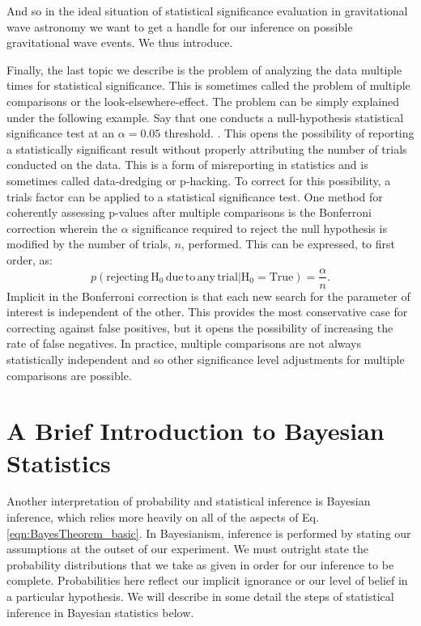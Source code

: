 And so in the ideal situation of statistical significance evaluation in gravitational wave astronomy we want to get a handle for our inference on possible gravitational wave events. We thus introduce.


Finally, the last topic we describe is the problem of analyzing the data multiple times for statistical significance. This is sometimes called the problem of multiple comparisons or the look-elsewhere-effect. The problem can be simply explained under the following example. Say that one conducts a null-hypothesis statistical significance test at an $\alpha = 0.05$ threshold. . This opens the possibility of reporting a statistically significant result without properly attributing the number of trials conducted on the data. This is a form of misreporting in statistics and is sometimes called data-dredging or p-hacking. To correct for this possibility, a trials factor can be applied to a statistical significance test. One method for coherently assessing p-values after multiple comparisons is the Bonferroni correction wherein the $\alpha$ significance required to reject the null hypothesis is modified by the number of trials, $n$, performed. This can be expressed, to first order, as:
\begin{equation}
    p\left(\mathrm{rejecting \, H_{0} \, due \, to \, any \, trial}| \mathrm{H_{0}} = \mathrm{True}\right) = \frac{\alpha}{n}.
\end{equation}
Implicit in the Bonferroni correction is that each new search for the parameter of interest is independent of the other. This provides the most conservative case for correcting against false positives, but it opens the possibility of increasing the rate of false negatives. In practice, multiple comparisons are not always statistically independent and so other significance level adjustments for multiple comparisons are possible.

\section{A Brief Introduction to Bayesian Statistics}
Another interpretation of probability and statistical inference is Bayesian inference, which relies more heavily on all of the aspects of Eq. \ref{eqn:BayesTheorem_basic}. In Bayesianism, inference is performed by stating our assumptions at the outset of our experiment. We must outright state the probability distributions that we take as given in order for our inference to be complete. Probabilities here reflect our implicit ignorance or our level of belief in a particular hypothesis. We will describe in some detail the steps of statistical inference in Bayesian statistics below.

